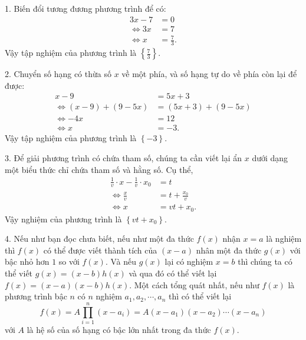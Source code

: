 \solution

1. Biến đổi tương đương phương trình để có:
\begin{align*}
   3x - 7 &= 0 \\
   \iff 3x &= 7\\
   \iff x &= \frac{7}{3}.
\end{align*}
Vậy tập nghiệm của phương trình là $\boxed{\displaystyle\left\{\frac{7}{3}\right\}}$.

2. Chuyển số hạng có thừa số $x$ về một phía, và số hạng tự do về phía còn lại để được:
\begin{align*}
   x - 9 &= 5x + 3 \\
   \iff (x - 9) + (9 - 5x) &= (5x + 3) + (9 - 5x) \\ 
   \iff -4x &= 12 \\
   \iff x &= -3.
\end{align*}
Vậy tập nghiệm của phương trình là $\boxed{\displaystyle\left\{-3\right\}}$.

3. Để giải phương trình có chứa tham số, chúng ta cần viết lại ẩn $x$ dưới dạng một biểu thức chỉ chứa tham số và hằng số. Cụ thể,
\begin{align*}
   \frac{1}{v}\cdot x - \frac{1}{v} \cdot x_0 &= t \\
   \iff \frac{x}{v} &= t + \frac{x_0}{v} \\
   \iff x &= vt + x_0.
\end{align*}
Vậy nghiệm của phương trình là $\boxed{\displaystyle\left\{vt + x_0\right\}}$.

4. Nếu như bạn đọc chưa biết, nếu như một đa thức $f(x)$ nhận $x = a$ là nghiệm thì $f(x)$ có thể được viết thành tích của $(x - a)$ nhân một đa thức $g(x)$ với bậc nhỏ hơn $1$ so với $f(x)$. Và nếu $g(x)$ lại có nghiệm $x = b$ thì chúng ta có thể viết $g(x) = (x-b)h(x)$ và qua đó có thể viết lại $f(x) = (x-a)(x-b)h(x)$. Một cách tổng quát nhất, nếu như $f(x)$ là phương trình bậc $n$ có $n$ nghiệm $a_1, a_2, \cdots, a_n$ thì có thể viết lại $$f(x) = A \prod_{i=1}^{n} (x - a_i) = A(x - a_1)(x - a_2)\cdots (x - a_n)$$ với $A$ là hệ số của số hạng có bậc lớn nhất trong đa thức $f(x)$.

